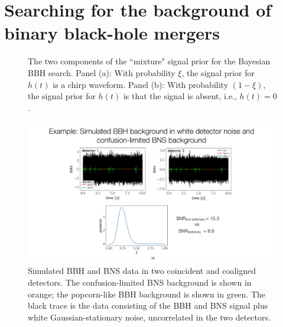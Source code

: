 \section{Searching for the background of binary black-hole
mergers}
\label{s:nonstationary}

%
\be 
\ee
%
%
\be 
\ee
%
%
\be 
\ee
%


\begin{figure}[htbp!]
\begin{center}
\hspace{1 in}
\caption{The two components of the ``mixture" signal prior for the Bayesian 
BBH search.
Panel (a): With probability $\xi$, the signal prior for $h(t)$ is a 
chirp waveform.
Panel (b): With probability $(1-\xi)$, the signal prior for $h(t)$ is that
the signal is absent, i.e., $h(t)=0$.}
\label{f:mixture_signal_priors}
\end{center}
\end{figure}

\begin{figure}[htbp!]
\begin{center}
\includegraphics[width=\textwidth]{Figures/BBH-BNS-simulated-data}
\caption{Simulated BBH and BNS data in two coincident and coaligned
detectors.
The confusion-limited BNS background is shown in orange;
the popcorn-like BBH background is shown in green.
The black trace is the data consisting of the BBH and BNS signal
plus white Gaussian-stationary noise, uncorrelated in the two
detectors.}
\label{f:BBH-BNS-simulated-data}
\end{center}
\end{figure}


